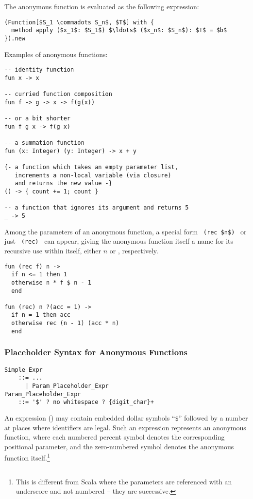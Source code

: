 The anonymous function is evaluated as the following expression:
\begin{lstlisting}
(Function[$S_1 \commadots S_n$, $T$] with {
  method apply ($x_1$: $S_1$) $\ldots$ ($x_n$: $S_n$): $T$ = $b$
}).new
\end{lstlisting}

\example Examples of anonymous functions:
\begin{lstlisting}[mathescape=false]
-- identity function
fun x -> x

-- curried function composition
fun f -> g -> x -> f(g(x))

-- or a bit shorter
fun f g x -> f(g x)

-- a summation function
fun (x: Integer) (y: Integer) -> x + y

{- a function which takes an empty parameter list,
   increments a non-local variable (via closure)
   and returns the new value -}
() -> { count += 1; count }

-- a function that ignores its argument and returns 5
_ -> 5 
\end{lstlisting}

Among the parameters of an anonymous function, a special form ~\lstinline!(rec $n$)!~ or just ~\lstinline!(rec)!~ can appear, giving the anonymous function itself a name for its recursive use within itself, either $n$ or , respectively. 

\begin{lstlisting}[mathescape=false]
fun (rec f) n -> 
  if n <= 1 then 1 
  otherwise n * f $ n - 1 
  end

fun (rec) n ?(acc = 1) -> 
  if n = 1 then acc 
  otherwise rec (n - 1) (acc * n)
  end
\end{lstlisting}





\subsubsection{Placeholder Syntax for Anonymous Functions}
\label{sec:placeholder-functions}

\grammar\begin{lstlisting}[mathescape=false,deletekeywords={no}]
Simple_Expr 
    ::= ...
      | Param_Placeholder_Expr
Param_Placeholder_Expr
    ::= '$' ? no whitespace ? {digit_char}+
\end{lstlisting}

An expression () may contain embedded dollar symbols ``\lstinline[mathescape=false]!$!'' followed by a number at places where identifiers are legal. Such an expression represents an anonymous function, where each numbered percent symbol denotes the corresponding positional parameter, and the zero-numbered symbol denotes the anonymous function itself.\footnote{This is different from Scala where the parameters are referenced with an underscore and not numbered -- they are successive.}

